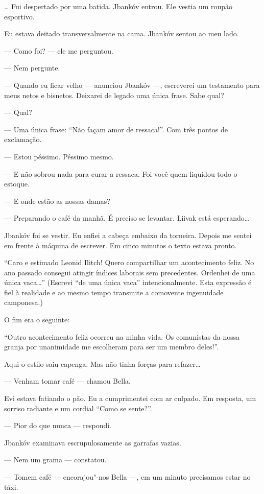 \ldots{} Fui despertado por uma batida. Jbankóv entrou. Ele vestia um roupão
esportivo.

Eu estava deitado transversalmente na cama. Jbankóv sentou ao meu lado.

--- Como foi? --- ele me perguntou.

--- Nem pergunte.

--- Quando eu ficar velho --- anunciou Jbankóv ---,
escreverei um testamento para meus netos e bisnetos. Deixarei de legado
uma única frase. Sabe qual?

--- Qual?

--- Uma única frase: ``Não façam amor de ressaca!''. Com três
pontos de exclamação.

--- Estou péssimo. Péssimo mesmo.

--- E não sobrou nada para curar a ressaca. Foi você quem
liquidou todo o estoque.

--- E onde estão as nossas damas?

--- Preparando o café da manhã. É preciso se levantar. Liivak
está esperando\ldots{}

Jbankóv foi se vestir. Eu enfiei a cabeça embaixo da torneira. Depois me
sentei em frente à máquina de escrever. Em cinco minutos o texto estava
pronto.

``Caro e estimado Leonid Ilitch! Quero compartilhar um acontecimento
feliz. No ano passado consegui atingir índices laborais sem precedentes.
Ordenhei de uma única vaca\ldots{}'' (Escrevi ``de uma única vaca''
intencionalmente. Esta expressão é fiel à realidade e ao mesmo tempo
transmite a comovente ingenuidade camponesa.)

O fim era o seguinte:

``Outro acontecimento feliz ocorreu na minha vida. Os comunistas da
nossa granja por unanimidade me escolheram para ser um membro deles!''.

Aqui o estilo saiu capenga. Mas não tinha forças para refazer\ldots{}

--- Venham tomar café --- chamou Bella.

Evi estava fatiando o pão. Eu a cumprimentei com ar culpado. Em
resposta, um sorriso radiante e um cordial ``Como se sente?''.

--- Pior do que nunca --- respondi.

Jbankóv examinava escrupulosamente as garrafas vazias.

--- Nem um grama --- constatou.

--- Tomem café --- encorajou"-nos Bella ---, em um
minuto precisamos estar no táxi.

